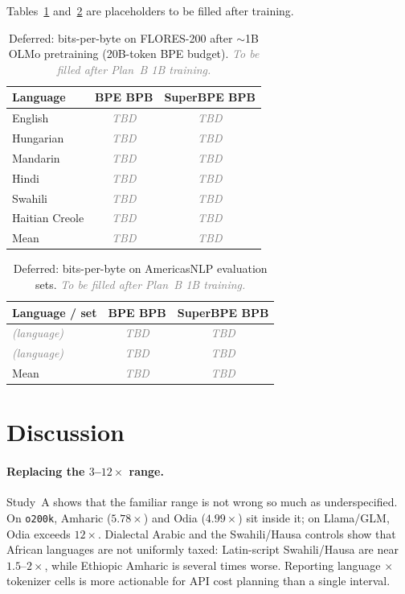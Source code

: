 \documentclass[11pt,a4paper]{article}
\newcommand{\todo}[1]{\textcolor{gray}{\textit{#1}}}
\newcommand{\tbd}{\todo{TBD}}
\begin{document}
Tables~\ref{tab:bpb-flores} and~\ref{tab:bpb-americas} are placeholders to be filled after training.

\begin{table}[t]
\centering
\caption{Deferred: bits-per-byte on FLORES-200 after $\sim$1B OLMo pretraining (20B-token BPE budget). \todo{To be filled after Plan~B 1B training.}}
\label{tab:bpb-flores}
\small
\begin{tabular}{@{}lcc@{}}
\toprule
Language & BPE BPB & SuperBPE BPB \\
\midrule
English        & \tbd & \tbd \\
Hungarian      & \tbd & \tbd \\
Mandarin       & \tbd & \tbd \\
Hindi          & \tbd & \tbd \\
Swahili        & \tbd & \tbd \\
Haitian Creole & \tbd & \tbd \\
\midrule
Mean           & \tbd & \tbd \\
\bottomrule
\end{tabular}
\end{table}

\begin{table}[t]
\centering
\caption{Deferred: bits-per-byte on AmericasNLP evaluation sets. \todo{To be filled after Plan~B 1B training.}}
\label{tab:bpb-americas}
\small
\begin{tabular}{@{}lcc@{}}
\toprule
Language / set & BPE BPB & SuperBPE BPB \\
\midrule
\todo{(language)} & \tbd & \tbd \\
\todo{(language)} & \tbd & \tbd \\
\midrule
Mean              & \tbd & \tbd \\
\bottomrule
\end{tabular}
\end{table}

\section{Discussion}
\label{sec:discussion}

\paragraph{Replacing the $3$--$12\times$ range.}
Study~A shows that the familiar range is not wrong so much as underspecified.
On \texttt{o200k}, Amharic ($5.78\times$) and Odia ($4.99\times$) sit inside it; on Llama/GLM, Odia exceeds $12\times$.
Dialectal Arabic and the Swahili/Hausa controls show that African languages are not uniformly taxed: Latin-script Swahili/Hausa are near $1.5$--$2\times$, while Ethiopic Amharic is several times worse.
Reporting language $\times$ tokenizer cells is more actionable for API cost planning than a single interval.
\end{document}
